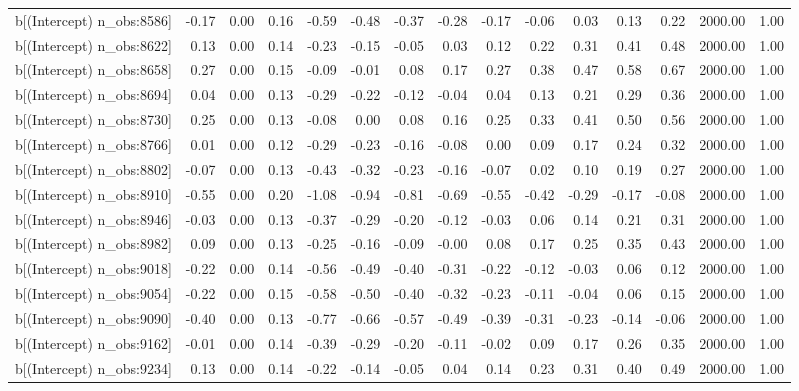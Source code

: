 \begin{table}[ht]
\begin{tabular}{rrrrrrrrrrrrrrr}
  b[(Intercept) n\_obs:8586] & -0.17 & 0.00 & 0.16 & -0.59 & -0.48 & -0.37 & -0.28 & -0.17 & -0.06 & 0.03 & 0.13 & 0.22 & 2000.00 & 1.00 \\ 
  b[(Intercept) n\_obs:8622] & 0.13 & 0.00 & 0.14 & -0.23 & -0.15 & -0.05 & 0.03 & 0.12 & 0.22 & 0.31 & 0.41 & 0.48 & 2000.00 & 1.00 \\ 
  b[(Intercept) n\_obs:8658] & 0.27 & 0.00 & 0.15 & -0.09 & -0.01 & 0.08 & 0.17 & 0.27 & 0.38 & 0.47 & 0.58 & 0.67 & 2000.00 & 1.00 \\ 
  b[(Intercept) n\_obs:8694] & 0.04 & 0.00 & 0.13 & -0.29 & -0.22 & -0.12 & -0.04 & 0.04 & 0.13 & 0.21 & 0.29 & 0.36 & 2000.00 & 1.00 \\ 
  b[(Intercept) n\_obs:8730] & 0.25 & 0.00 & 0.13 & -0.08 & 0.00 & 0.08 & 0.16 & 0.25 & 0.33 & 0.41 & 0.50 & 0.56 & 2000.00 & 1.00 \\ 
  b[(Intercept) n\_obs:8766] & 0.01 & 0.00 & 0.12 & -0.29 & -0.23 & -0.16 & -0.08 & 0.00 & 0.09 & 0.17 & 0.24 & 0.32 & 2000.00 & 1.00 \\ 
  b[(Intercept) n\_obs:8802] & -0.07 & 0.00 & 0.13 & -0.43 & -0.32 & -0.23 & -0.16 & -0.07 & 0.02 & 0.10 & 0.19 & 0.27 & 2000.00 & 1.00 \\ 
  b[(Intercept) n\_obs:8910] & -0.55 & 0.00 & 0.20 & -1.08 & -0.94 & -0.81 & -0.69 & -0.55 & -0.42 & -0.29 & -0.17 & -0.08 & 2000.00 & 1.00 \\ 
  b[(Intercept) n\_obs:8946] & -0.03 & 0.00 & 0.13 & -0.37 & -0.29 & -0.20 & -0.12 & -0.03 & 0.06 & 0.14 & 0.21 & 0.31 & 2000.00 & 1.00 \\ 
  b[(Intercept) n\_obs:8982] & 0.09 & 0.00 & 0.13 & -0.25 & -0.16 & -0.09 & -0.00 & 0.08 & 0.17 & 0.25 & 0.35 & 0.43 & 2000.00 & 1.00 \\ 
  b[(Intercept) n\_obs:9018] & -0.22 & 0.00 & 0.14 & -0.56 & -0.49 & -0.40 & -0.31 & -0.22 & -0.12 & -0.03 & 0.06 & 0.12 & 2000.00 & 1.00 \\ 
  b[(Intercept) n\_obs:9054] & -0.22 & 0.00 & 0.15 & -0.58 & -0.50 & -0.40 & -0.32 & -0.23 & -0.11 & -0.04 & 0.06 & 0.15 & 2000.00 & 1.00 \\ 
  b[(Intercept) n\_obs:9090] & -0.40 & 0.00 & 0.13 & -0.77 & -0.66 & -0.57 & -0.49 & -0.39 & -0.31 & -0.23 & -0.14 & -0.06 & 2000.00 & 1.00 \\ 
  b[(Intercept) n\_obs:9162] & -0.01 & 0.00 & 0.14 & -0.39 & -0.29 & -0.20 & -0.11 & -0.02 & 0.09 & 0.17 & 0.26 & 0.35 & 2000.00 & 1.00 \\ 
  b[(Intercept) n\_obs:9234] & 0.13 & 0.00 & 0.14 & -0.22 & -0.14 & -0.05 & 0.04 & 0.14 & 0.23 & 0.31 & 0.40 & 0.49 & 2000.00 & 1.00 \\ 

\end{tabular}
\end{table}
